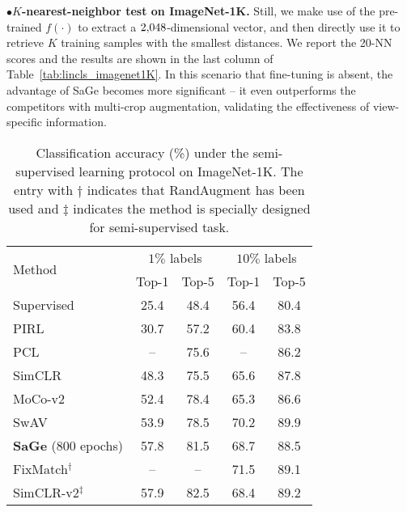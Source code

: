 \documentclass[10pt,twocolumn,letterpaper]{article}
\begin{document}
\vspace{0.1cm}\noindent
$\bullet$\hspace{0.2cm}\textbf{$K$-nearest-neighbor test on ImageNet-1K.} Still, we make use of the pre-trained $f(\cdot)$ to extract a $2\rm{,}048$-dimensional vector, and then directly use it to retrieve $K$ training samples with the smallest distances. We report the 20-NN scores and the results are shown in the last column of Table~\ref{tab:lincls_imagenet1K}. In this scenario that fine-tuning is absent, the advantage of SaGe becomes more significant -- it even outperforms the competitors with multi-crop augmentation, validating the effectiveness of view-specific information.

\begin{table}[!t]
\fontsize{9.5}{11.0}\selectfont
\centering
\setlength{\tabcolsep}{2.0mm}
\begin{tabular}{l|cc|cc}
\toprule
\multirow{2}{*}{Method} & \multicolumn{2}{c|}{$1\%$ labels} & \multicolumn{2}{c}{$10\%$ labels} \\
\multicolumn{1}{c|}{}            & Top-1  & Top-5    & Top-1  & Top-5 \\\midrule
Supervised                      & 25.4   & 48.4     & 56.4   & 80.4  \\ \midrule
PIRL~\cite{misra2020self}        & 30.7   & 57.2     & 60.4   & 83.8  \\
PCL~\cite{li2020prototypical}    & --     & 75.6     & --     & 86.2 \\
SimCLR~\cite{chen2020simple}     & 48.3   & 75.5     & 65.6   & 87.8 \\
MoCo-v2~\cite{chen2020improved}  & 52.4   & 78.4     & 65.3   & 86.6 \\
SwAV\cite{caron2020unsupervised} & 53.9   & 78.5     & 70.2   & 89.9  \\
\midrule
\textbf{SaGe} (800 epochs)  &57.8   &81.5     &68.7   &88.5   \\
\midrule
FixMatch$^{\dagger}$~\cite{sohn2020fixmatch} & --     & --       & 71.5   & 89.1  \\
SimCLR-v2$^\ddagger$\cite{chen2020big}      & 57.9   & 82.5     & 68.4   & 89.2 \\
\bottomrule
\end{tabular}
\caption{Classification accuracy (\%) under the semi-supervised learning protocol on ImageNet-1K. The entry with $\dagger$ indicates that RandAugment has been used and $\ddagger$ indicates the method is specially designed for semi-supervised task.}
\label{tab:semi_imagenet}
\end{table}
\end{document}
